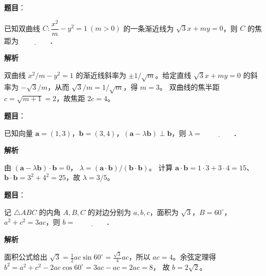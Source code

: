 \begin{answer}

\textbf{题目}：

已知双曲线 $C:\dfrac{x^2}{m}-y^2=1\ (m>0)$ 的一条渐近线为 $\sqrt3x+my=0$，则 $C$ 的焦距为 $\underline{\qquad\qquad}$．

\textbf{解析}

双曲线 $x^2/m-y^2=1$ 的渐近线斜率为 $\pm1/\sqrt m$。给定直线 $\sqrt3x+my=0$ 的斜率为 $-\sqrt3/m$，从而
$\sqrt3/m=1/\sqrt m$，得 $m=3$。
双曲线的焦半距 $c=\sqrt{m+1}=2$，故焦距 $2c=4$。


\end{answer}
\begin{answer}

\textbf{题目}：

已知向量 $\boldsymbol a=(1,3)$，$\boldsymbol b=(3,4)$，$(\boldsymbol a-\lambda\boldsymbol b)\perp\boldsymbol b$，则 $\lambda=$ $\underline{\qquad\qquad}$．

\textbf{解析}

由 $(\boldsymbol a-\lambda\boldsymbol b)\cdot\boldsymbol b=0$，
$\lambda=(\boldsymbol a\cdot\boldsymbol b)/(\boldsymbol b\cdot\boldsymbol b)$。
计算 $\boldsymbol a\cdot\boldsymbol b=1\cdot3+3\cdot4=15$、$\boldsymbol b\cdot\boldsymbol b=3^2+4^2=25$，故 $\lambda=3/5$。


\end{answer}
\begin{answer}

\textbf{题目}：

记 $\triangle ABC$ 的内角 $A,B,C$ 的对边分别为 $a,b,c$，面积为 $\sqrt3$，$B=60^\circ$，$a^2+c^2=3ac$，则 $b=$ $\underline{\qquad\qquad}$．

\textbf{解析}

面积公式给出 $\sqrt3=\frac12ac\sin60^\circ=\frac{\sqrt3}{4}ac$，所以 $ac=4$。余弦定理得
$b^2=a^2+c^2-2ac\cos60^\circ=3ac-ac=2ac=8$，
故 $b=2\sqrt2$。


\end{answer}
